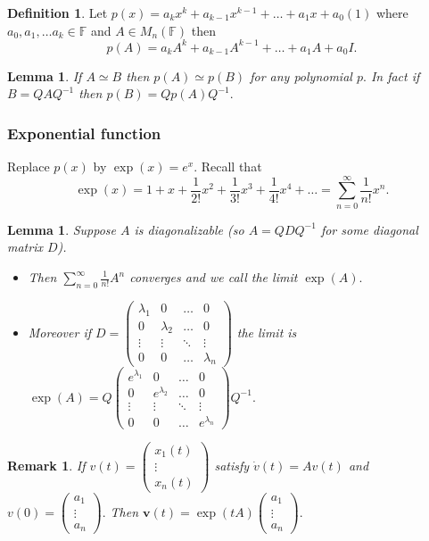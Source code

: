 \documentclass[12pt, a4paper]{article}
\newcommand{\bb}[1]{\mathbb{#1}}
\newtheorem*{remark}{Remark}
\theoremstyle{definition}
\newtheorem{definition}{Definition}[section]
\theoremstyle{plain}
\newtheorem{lemma}[theorem]{Lemma}
\begin{document}
\begin{definition}
Let $p(x)=a_kx^k+a_{k-1}x^{k-1}+\ldots+a_1x+a_0(1)$ where $a_0,a_1,\ldots a_k \in \bb{F}$ and $A \in M_n(\bb{F})$ then $$p(A)=a_kA^k+a_{k-1}A^{k-1}+\ldots+a_1A+a_0I.$$ 
\end{definition}

\begin{lemma}
If $A \simeq B$ then $p(A)\simeq p(B)$ for any polynomial $p.$ In fact if $B =QAQ^{-1}$ then $p(B)=Qp(A)Q^{-1}.$
\end{lemma}

\subsubsection{Exponential function}

Replace $p(x)$ by $\exp(x)=e^x.$ Recall that $$\exp(x) = 1+x+\frac{1}{2!}x^2+\frac{1}{3!}x^3+\frac{1}{4!}x^4+\ldots = \sum_{n=0}^{\infty} \frac{1}{n!}x^n.$$

\begin{lemma}
Suppose $A$ is diagonalizable (so $A=QDQ^{-1}$ for some diagonal matrix $D$).
\begin{itemize}

	\item Then $\sum_{n=0}^{\infty}\frac{1}{n!}A^n$ converges and we call the limit $\exp(A).$ 

	\item Moreover if $D=\begin{pmatrix} \lambda_1 &0&\ldots &0 \\ 0 & \lambda_2 & \ldots &0 \\ \vdots &\vdots &\ddots & \vdots \\ 0 & 0 & \ldots & \lambda_n  \end{pmatrix}$ the limit is $\exp(A) = Q\begin{pmatrix} e^{\lambda_1} &0&\ldots &0 \\ 0 & e^{\lambda_2} & \ldots &0 \\ \vdots &\vdots &\ddots & \vdots \\ 0 & 0 & \ldots & e^{\lambda_n}  \end{pmatrix}Q^{-1}.$

\end{itemize}
\end{lemma}

\begin{remark}
If $v(t) = \begin{pmatrix} x_1(t) \\ \vdots \\x_n(t) \end{pmatrix}$ satisfy $\dot{v}(t)=Av(t)$ and $v(0)=\begin{pmatrix} a_1 \\ \vdots \\ a_n\end{pmatrix}.$ Then $\mathbf{v}(t)= \exp(tA)\begin{pmatrix} a_1 \\ \vdots \\ a_n\end{pmatrix}.$ 
\end{remark}
\end{document}
